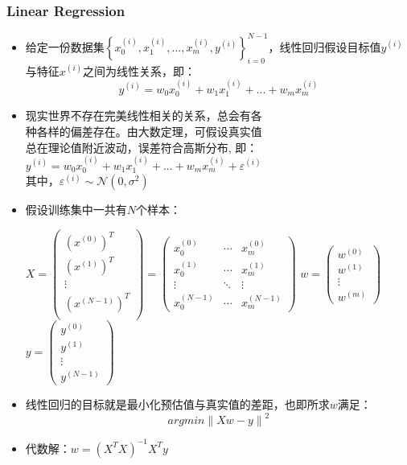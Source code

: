 \documentclass[10pt,a4paper]{ctexbook}
\begin{document}
\subsubsection{Linear Regression}
\begin{itemize}

\item 给定一份数据集$\left\{x_0^{(i)},x_1^{(i)},...,x_m^{(i)},y^{(i)}\right\}_{i=0}^{N-1}$，线性回归假设目标值$y^{(i)}$与特征$x^{(i)}$之间为线性关系，即：$$y^{(i)}=w_0x_0^{(i)}+w_1x_1^{(i)}+...+w_mx_m^{(i)}$$

\item 现实世界不存在完美线性相关的关系，总会有各\\
种各样的偏差存在。由大数定理，可假设真实值\\
总在理论值附近波动，误差符合高斯分布, 即：\\
$y^{(i)}=w_0x_0^{(i)}+w_1x_1^{(i)}+...+w_mx_m^{(i)}+\varepsilon^{(i)}$\\
其中，$\varepsilon^{(i)}\sim{\mathcal{N}}(0, \sigma^{2})$

\item 假设训练集中一共有$N$个样本：

$X=\left(
\begin{array}{c}
        {(x^{(0)})}^T \\
        {(x^{(1)})}^T \\
        \vdots \\
        {(x^{(N-1)})}^T \\
\end{array}
\right)=\left(
\begin{array}{ccc}
        x_0^{(0)} & \cdots & x_m^{(0)} \\
        x_0^{(1)} & \cdots & x_m^{(1)} \\
        \vdots & \ddots & \vdots\\
        x_0^{(N-1)} & \cdots & x_m^{(N-1)}
\end{array}
\right)$
$w=\left(
\begin{array}{c}
        w^{(0)} \\
        w^{(1)} \\
        \vdots \\
        w^{(m)}
\end{array}
\right)$
$y=\left(
\begin{array}{c}
        y^{(0)} \\
        y^{(1)} \\
        \vdots \\
        y^{(N-1)}
\end{array}
\right)$

\item 线性回归的目标就是最小化预估值与真实值的差距，也即所求$w$满足：$$argmin \left\|{Xw-y}\right\|^{2}$$
\item 代数解：$w=(X^{T}X)^{-1}X^{T}y$
\end{itemize}
\end{document}
